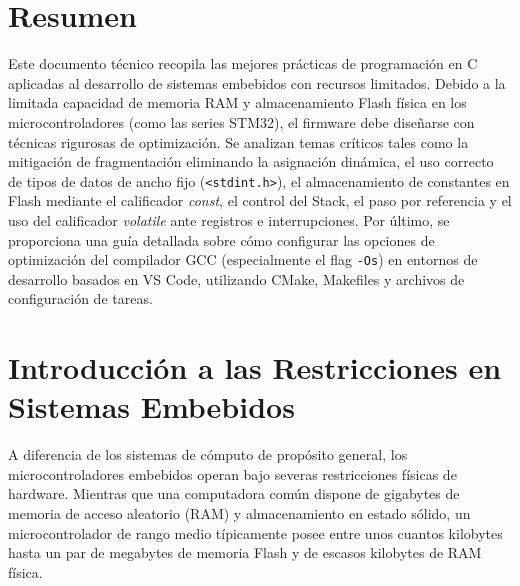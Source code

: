 \documentclass[
10pt, %
a4paper, %
oneside, %
headinclude,footinclude, %
BCOR5mm, %
]{scrartcl}
\begin{document}
\setcounter{tocdepth}{3} 

\section*{Resumen}
Este documento técnico recopila las mejores prácticas de programación en C aplicadas al desarrollo de sistemas embebidos con recursos limitados. Debido a la limitada capacidad de memoria RAM y almacenamiento Flash física en los microcontroladores (como las series STM32), el firmware debe diseñarse con técnicas rigurosas de optimización. Se analizan temas críticos tales como la mitigación de fragmentación eliminando la asignación dinámica, el uso correcto de tipos de datos de ancho fijo (\texttt{<stdint.h>}), el almacenamiento de constantes en Flash mediante el calificador \textit{const}, el control del Stack, el paso por referencia y el uso del calificador \textit{volatile} ante registros e interrupciones. Por último, se proporciona una guía detallada sobre cómo configurar las opciones de optimización del compilador GCC (especialmente el flag \texttt{-Os}) en entornos de desarrollo basados en VS Code, utilizando CMake, Makefiles y archivos de configuración de tareas.

\newpage 

\tableofcontents 

\newpage

\section{Introducción a las Restricciones en Sistemas Embebidos}

A diferencia de los sistemas de cómputo de propósito general, los microcontroladores embebidos operan bajo severas restricciones físicas de hardware. Mientras que una computadora común dispone de gigabytes de memoria de acceso aleatorio (RAM) y almacenamiento en estado sólido, un microcontrolador de rango medio típicamente posee entre unos cuantos kilobytes hasta un par de megabytes de memoria Flash y de escasos kilobytes de RAM física.
\end{document}
